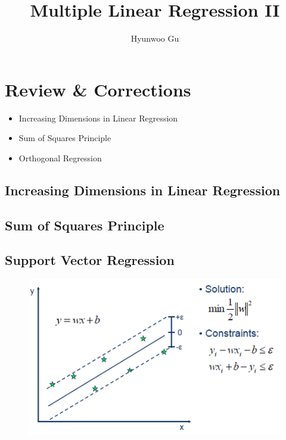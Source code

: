 \documentclass[12pt]{article}
\begin{document}
\title{\textbf{Multiple Linear Regression II}}
\author{Hyunwoo Gu}
\date{}

\maketitle


\section*{Review \& Corrections}

\begin{itemize}
	\item Increasing Dimensions in Linear Regression
	\item Sum of Squares Principle
	\item Orthogonal Regression
\end{itemize}

\subsection*{Increasing Dimensions in Linear Regression}

\subsection*{Sum of Squares Principle}

\subsection*{Support Vector Regression}

\begin{figure}[h!]
	\centering
	\includegraphics[scale=0.5]{SVR.png}
\end{figure}
\end{document}

